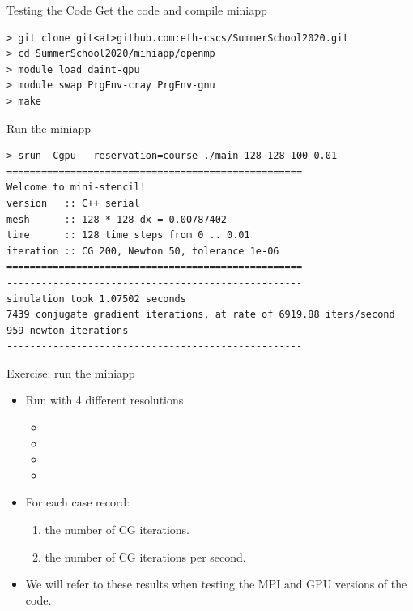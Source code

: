\documentclass[aspectratio=43]{beamer}
\begin{document}
\begin{frame}[fragile]{Testing the Code}
    Get the code and compile miniapp
\begin{lstlisting}[style=terminal]
> git clone git<at>github.com:eth-cscs/SummerSchool2020.git
> cd SummerSchool2020/miniapp/openmp
> module load daint-gpu
> module swap PrgEnv-cray PrgEnv-gnu
> make
\end{lstlisting}
    Run the miniapp
\begin{lstlisting}[style=terminal]
> srun -Cgpu --reservation=course ./main 128 128 100 0.01
===================================================
Welcome to mini-stencil!
version   :: C++ serial
mesh      :: 128 * 128 dx = 0.00787402
time      :: 128 time steps from 0 .. 0.01
iteration :: CG 200, Newton 50, tolerance 1e-06
===================================================
---------------------------------------------------
simulation took 1.07502 seconds
7439 conjugate gradient iterations, at rate of 6919.88 iters/second
959 newton iterations
---------------------------------------------------
\end{lstlisting}
\end{frame}

\begin{frame}[fragile]{Exercise: run the miniapp}
    \begin{itemize}
        \item Run with 4 different resolutions
        \begin{itemize}
            \item {}
            \item {}
            \item {}
            \item {}
        \end{itemize}
        \item For each case record:
        \begin{enumerate}
            \item the number of CG iterations.
            \item the number of CG iterations per second.
        \end{enumerate}
        \item We will refer to these results when testing the MPI and GPU versions of the code.
    \end{itemize}
\end{frame}
\end{document}
